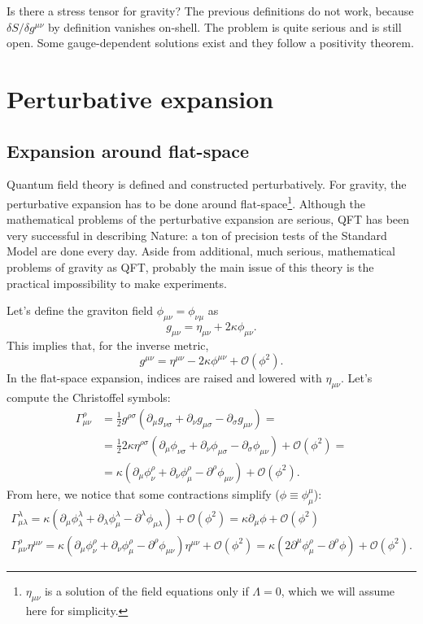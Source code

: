 \documentclass[a4paper,12pt]{book}
\theoremstyle{definition}
\theoremstyle{remark}
\begin{document}
Is there a stress tensor for gravity? The previous definitions do not work, because $\delta S/\delta g^{\mu\nu}$ by definition vanishes on-shell. The problem is quite serious and is still open. Some gauge-dependent solutions exist and they follow a positivity theorem.

\chapter{Perturbative expansion}
\section{Expansion around flat-space}
Quantum field theory is defined and constructed perturbatively. For gravity, the perturbative expansion has to be done around flat-space\footnote{$\eta_{\mu\nu}$ is a solution of the field equations only if $\Lambda=0$, which we will assume here for simplicity.}. Although the mathematical problems of the perturbative expansion are serious, QFT has been very successful in describing Nature: a ton of precision tests of the Standard Model are done every day. Aside from additional, much serious, mathematical problems of gravity as QFT, probably the main issue of this theory is the practical impossibility to make experiments.

Let's define the graviton field $\phi_{\mu\nu}=\phi_{\nu\mu}$ as
\[g_{\mu\nu}=\eta_{\mu\nu}+2\kappa\phi_{\mu\nu}.\]
This implies that, for the inverse metric,
\[g^{\mu\nu}=\eta^{\mu\nu}-2\kappa\phi^{\mu\nu}+\mathcal O(\phi^2).\]
In the flat-space expansion, indices are raised and lowered with $\eta_{\mu\nu}$. Let's compute the Christoffel symbols:
\begin{align*}
\Gamma^\rho_{\mu\nu}&=\frac12g^{\rho\sigma}(\partial_\mu g_{\nu\sigma}+\partial_\nu g_{\mu\sigma}-\partial_\sigma g_{\mu\nu})=\\
&=\frac122\kappa\eta^{\rho\sigma}(\partial_\mu\phi_{\nu\sigma}+\partial_\nu\phi_{\mu\sigma}-\partial_\sigma\phi_{\mu\nu})+\mathcal O(\phi^2)=\\
&=\kappa(\partial_\mu\phi^\rho_\nu+\partial_\nu\phi^\rho_\mu-\partial^\rho\phi_{\mu\nu})+\mathcal O(\phi^2).
\end{align*}
From here, we notice that some contractions simplify ($\phi\equiv \phi^\mu_\mu$):
\begin{gather*}
\Gamma^\lambda_{\mu\lambda}=\kappa(\partial_\mu\phi^\lambda_\lambda+\partial_\lambda\phi^\lambda_\mu-\partial^\lambda\phi_{\mu\lambda})+\mathcal O(\phi^2)=\kappa\partial_\mu\phi+\mathcal O(\phi^2)\\
\Gamma^\rho_{\mu\nu}\eta^{\mu\nu}=\kappa(\partial_\mu\phi^\rho_\nu+\partial_\nu\phi^\rho_\mu-\partial^\rho\phi_{\mu\nu})\eta^{\mu\nu}+\mathcal O(\phi^2)=\kappa(2\partial^\mu\phi^\rho_\mu-\partial^\rho\phi)+\mathcal O(\phi^2).
\end{gather*}
\end{document}
